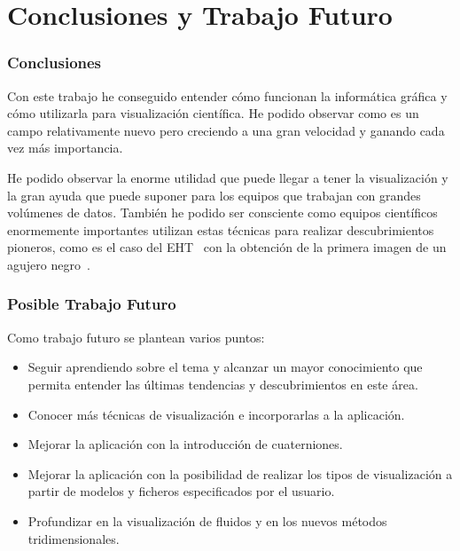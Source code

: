 \cleardoublepage

\chapter{Conclusiones y Trabajo Futuro}
\label{makereference6}

\subsection{Conclusiones}
\label{ref:Conclusions}

Con este trabajo he conseguido entender cómo funcionan la informática gráfica y
cómo utilizarla para visualización científica. He podido observar como es un
campo relativamente nuevo pero creciendo a una gran velocidad y ganando cada vez
más importancia.

He podido observar la enorme utilidad que puede llegar a tener la visualización
y la gran ayuda que puede suponer para los equipos que trabajan con grandes
volúmenes de datos. También he podido ser consciente como equipos científicos
enormemente importantes utilizan estas técnicas para realizar descubrimientos
pioneros, como es el caso del EHT~\cite{EHT} con la obtención de la primera imagen
de un agujero negro~\cite{1435174}.

\subsection{Posible Trabajo Futuro}
Como trabajo futuro se plantean varios puntos:

\begin{itemize}

		\item Seguir aprendiendo sobre el tema y alcanzar un mayor
				conocimiento que permita entender las últimas tendencias y
				descubrimientos en este área.

		\item Conocer más técnicas de visualización e incorporarlas a la
				aplicación.

		\item Mejorar la aplicación con la introducción de cuaterniones.

		\item Mejorar la aplicación con la posibilidad de realizar los tipos
				de visualización a partir de modelos y ficheros especificados
				por el usuario.

		\item Profundizar en la visualización de fluidos y en los nuevos
				métodos tridimensionales.

\end{itemize}
